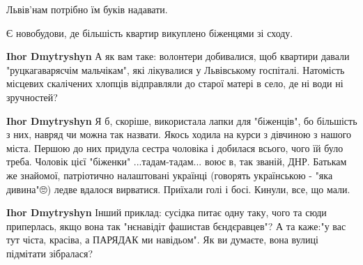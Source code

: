 \begin{itemize}
\begin{itemize}
Львів'нам потрібно їм буків надавати.
\end{itemize}

 
Є новобудови, де більшість квартир викуплено біженцями зі сходу.

\begin{itemize}
 
\textbf{Ihor Dmytryshyn} А як вам таке: волонтери добивалися, щоб квартири давали "руцкагаварясчім мальчікам", які лікувалися у Львівському госпіталі. Натомість місцевих скалічених хлопців відправляли до старої матері в село, де ні води ні зручностей?

 
\textbf{Ihor Dmytryshyn} Я б, скоріше, використала лапки для "біженців", бо більшість з них, навряд чи можна так назвати. Якось ходила на курси з дівчиною з нашого міста. Першою до них придула сестра чоловіка і добилася всього, чого їй було треба. Чоловік цієї "біженки" ...тадам-тадам... воює в, так званій, ДНР. Батькам же знайомої, патріотично налаштовані українці (говорять українською - "яка дивина"🙄) ледве вдалося вирватися. Приїхали голі і босі. Кинули, все, що мали.

 
\textbf{Ihor Dmytryshyn} Інший приклад: сусідка питає одну таку, чого та сюди приперлась, якщо вона так "нєнавідіт фашистав бєндєравцев"? А та каже:"у вас тут чіста, красіва, а ПАРЯДАК ми навідьом". Як ви думаєте, вона вулиці підмітати зібралася?


\end{itemize}
\end{itemize}
